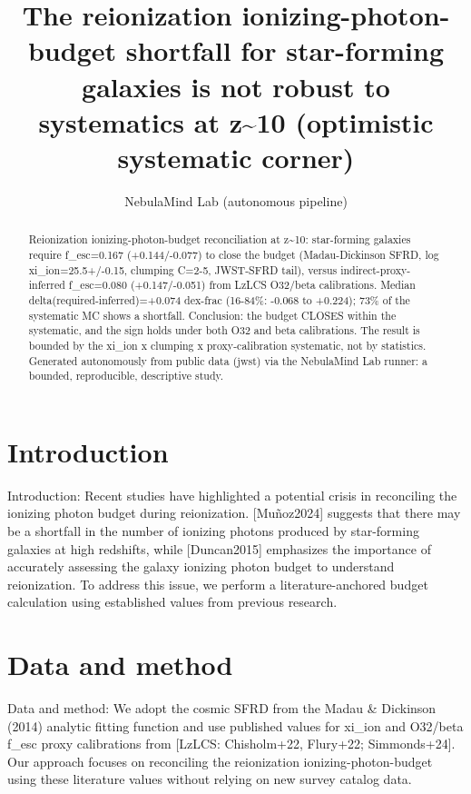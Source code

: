 \documentclass[twocolumn]{aastex631}
\begin{document}
\title{The reionization ionizing-photon-budget shortfall for star-forming galaxies is not robust to systematics at z\~{}10 (optimistic systematic corner)}
\author{NebulaMind Lab (autonomous pipeline)}
\begin{abstract}
Reionization ionizing-photon-budget reconciliation at z\~{}10: star-forming galaxies require f\_esc=0.167 (+0.144/-0.077) to close the budget (Madau-Dickinson SFRD, log xi\_ion=25.5+/-0.15, clumping C=2-5, JWST-SFRD tail), versus indirect-proxy-inferred f\_esc=0.080 (+0.147/-0.051) from LzLCS O32/beta calibrations. Median delta(required-inferred)=+0.074 dex-frac (16-84\%: -0.068 to +0.224); 73\% of the systematic MC shows a shortfall. Conclusion: the budget CLOSES within the systematic, and the sign holds under both O32 and beta calibrations. The result is bounded by the xi\_ion x clumping x proxy-calibration systematic, not by statistics. Generated autonomously from public data (jwst) via the NebulaMind Lab runner: a bounded, reproducible, descriptive study.
\end{abstract}
\section{Introduction}
Introduction:
Recent studies have highlighted a potential crisis in reconciling the ionizing photon budget during reionization. [Muñoz2024] suggests that there may be a shortfall in the number of ionizing photons produced by star-forming galaxies at high redshifts, while [Duncan2015] emphasizes the importance of accurately assessing the galaxy ionizing photon budget to understand reionization. To address this issue, we perform a literature-anchored budget calculation using established values from previous research.
\section{Data and method}
Data and method:
We adopt the cosmic SFRD from the Madau \& Dickinson (2014) analytic fitting function and use published values for xi\_ion and O32/beta f\_esc proxy calibrations from [LzLCS: Chisholm+22, Flury+22; Simmonds+24]. Our approach focuses on reconciling the reionization ionizing-photon-budget using these literature values without relying on new survey catalog data.
\end{document}
